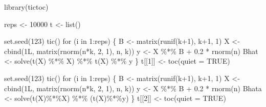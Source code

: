\documentclass[
  letterpaper,
]{book}
\newenvironment{Shaded}{\begin{snugshade}}{\end{snugshade}}
\newcommand{\AttributeTok}[1]{\textcolor[rgb]{0.40,0.45,0.13}{#1}}
\newcommand{\ConstantTok}[1]{\textcolor[rgb]{0.56,0.35,0.01}{#1}}
\newcommand{\ControlFlowTok}[1]{\textcolor[rgb]{0.00,0.23,0.31}{#1}}
\newcommand{\DecValTok}[1]{\textcolor[rgb]{0.68,0.00,0.00}{#1}}
\newcommand{\FloatTok}[1]{\textcolor[rgb]{0.68,0.00,0.00}{#1}}
\newcommand{\FunctionTok}[1]{\textcolor[rgb]{0.28,0.35,0.67}{#1}}
\newcommand{\NormalTok}[1]{\textcolor[rgb]{0.00,0.23,0.31}{#1}}
\newcommand{\OtherTok}[1]{\textcolor[rgb]{0.00,0.23,0.31}{#1}}
\newcommand{\SpecialCharTok}[1]{\textcolor[rgb]{0.37,0.37,0.37}{#1}}
\begin{document}
\begin{Shaded}
\begin{Highlighting}[]
\FunctionTok{library}\NormalTok{(tictoc)}

\NormalTok{reps }\OtherTok{\textless{}{-}} \DecValTok{10000}
\NormalTok{t    }\OtherTok{\textless{}{-}} \FunctionTok{list}\NormalTok{()}

\FunctionTok{set.seed}\NormalTok{(}\DecValTok{123}\NormalTok{)}
\FunctionTok{tic}\NormalTok{()}
\ControlFlowTok{for}\NormalTok{ (i }\ControlFlowTok{in} \DecValTok{1}\SpecialCharTok{:}\NormalTok{reps) \{ }
\NormalTok{  B }\OtherTok{\textless{}{-}} \FunctionTok{matrix}\NormalTok{(}\FunctionTok{runif}\NormalTok{(k}\SpecialCharTok{+}\DecValTok{1}\NormalTok{), k}\SpecialCharTok{+}\DecValTok{1}\NormalTok{, }\DecValTok{1}\NormalTok{)}
\NormalTok{  X }\OtherTok{\textless{}{-}} \FunctionTok{cbind}\NormalTok{(1L, }\FunctionTok{matrix}\NormalTok{(}\FunctionTok{rnorm}\NormalTok{(n}\SpecialCharTok{*}\NormalTok{k, }\DecValTok{2}\NormalTok{, }\DecValTok{1}\NormalTok{), n, k))}
\NormalTok{  y }\OtherTok{\textless{}{-}}\NormalTok{ X }\SpecialCharTok{\%*\%}\NormalTok{ B }\SpecialCharTok{+} \FloatTok{0.2} \SpecialCharTok{*} \FunctionTok{rnorm}\NormalTok{(n) }
\NormalTok{  Bhat }\OtherTok{\textless{}{-}} \FunctionTok{solve}\NormalTok{(}\FunctionTok{t}\NormalTok{(X) }\SpecialCharTok{\%*\%}\NormalTok{ X) }\SpecialCharTok{\%*\%} \FunctionTok{t}\NormalTok{(X) }\SpecialCharTok{\%*\%}\NormalTok{ y }
\NormalTok{  \}}
\NormalTok{t[[}\DecValTok{1}\NormalTok{]] }\OtherTok{\textless{}{-}} \FunctionTok{toc}\NormalTok{(}\AttributeTok{quiet =} \ConstantTok{TRUE}\NormalTok{)}

\FunctionTok{set.seed}\NormalTok{(}\DecValTok{123}\NormalTok{)}
\FunctionTok{tic}\NormalTok{()}
\ControlFlowTok{for}\NormalTok{ (i }\ControlFlowTok{in} \DecValTok{1}\SpecialCharTok{:}\NormalTok{reps) \{ }
\NormalTok{  B }\OtherTok{\textless{}{-}} \FunctionTok{matrix}\NormalTok{(}\FunctionTok{runif}\NormalTok{(k}\SpecialCharTok{+}\DecValTok{1}\NormalTok{), k}\SpecialCharTok{+}\DecValTok{1}\NormalTok{, }\DecValTok{1}\NormalTok{)}
\NormalTok{  X }\OtherTok{\textless{}{-}} \FunctionTok{cbind}\NormalTok{(1L, }\FunctionTok{matrix}\NormalTok{(}\FunctionTok{rnorm}\NormalTok{(n}\SpecialCharTok{*}\NormalTok{k, }\DecValTok{2}\NormalTok{, }\DecValTok{1}\NormalTok{), n, k))}
\NormalTok{  y }\OtherTok{\textless{}{-}}\NormalTok{ X }\SpecialCharTok{\%*\%}\NormalTok{ B }\SpecialCharTok{+} \FloatTok{0.2} \SpecialCharTok{*} \FunctionTok{rnorm}\NormalTok{(n) }
\NormalTok{  Bhata }\OtherTok{\textless{}{-}} \FunctionTok{solve}\NormalTok{(}\FunctionTok{t}\NormalTok{(X)}\SpecialCharTok{\%*\%}\NormalTok{X) }\SpecialCharTok{\%*\%}\NormalTok{ (}\FunctionTok{t}\NormalTok{(X)}\SpecialCharTok{\%*\%}\NormalTok{y) }
\NormalTok{\}}
\NormalTok{t[[}\DecValTok{2}\NormalTok{]] }\OtherTok{\textless{}{-}} \FunctionTok{toc}\NormalTok{(}\AttributeTok{quiet =} \ConstantTok{TRUE}\NormalTok{)}


\end{Highlighting}
\end{Shaded}
\end{document}
